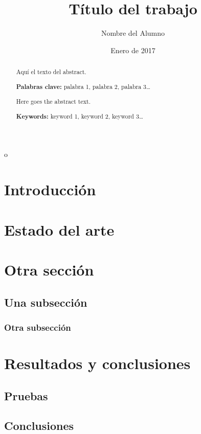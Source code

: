 o\documentclass[a4paper, 12pt]{article} %
\author{Nombre del Alumno}
\date{Enero de 2017}
\title{Título del trabajo}
\begin{document}
\maketitle
\null%
\newpage

\tableofcontents
\newpage

\listoffigures
\listoftables
\newpage

\begin{abstract}
  \normalsize
  Aquí el texto del abstract.

  \textbf{Palabras clave:} palabra 1, palabra 2, palabra 3\ldots
\end{abstract}

\begin{otherlanguage}{english}
  \begin{abstract}
    \normalsize
    Here goes the abstract text.

    \textbf{Keywords:} keyword 1, keyword 2, keyword 3\ldots
  \end{abstract}
\end{otherlanguage}

\newpage
{} %

\section{Introducción}

\section{Estado del arte}

\section{Otra sección}

\subsection{Una subsección}

\subsubsection{Otra subsección}

\section{Resultados y conclusiones}

\subsection{Pruebas}

\subsection{Conclusiones}

\printbibliography[heading=bibnumbered] %
\end{document}
